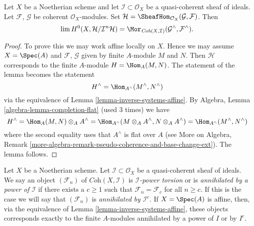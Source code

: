 \begin{lemma}
\label{lemma-completion-internal-hom}
Let $X$ be a Noetherian scheme and let $\mathcal{I} \subset \mathcal{O}_X$
be a quasi-coherent sheaf of ideals. Let $\mathcal{F}$, $\mathcal{G}$ be
coherent $\mathcal{O}_X$-modules. Set
$\mathcal{H} = \SheafHom_{\mathcal{O}_X}(\mathcal{G}, \mathcal{F})$.
Then
$$
\lim H^0(X, \mathcal{H}/\mathcal{I}^n\mathcal{H}) =
\Mor_{\textit{Coh}(X, \mathcal{I})}
(\mathcal{G}^\wedge, \mathcal{F}^\wedge).
$$
\end{lemma}

\begin{proof}
To prove this we may work affine locally on $X$.
Hence we may assume $X = \Spec(A)$ and $\mathcal{F}$, $\mathcal{G}$
given by finite $A$-module $M$ and $N$. Then $\mathcal{H}$
corresponds to the finite $A$-module $H = \Hom_A(M, N)$.
The statement of the lemma becomes the statement
$$
H^\wedge = \Hom_{A^\wedge}(M^\wedge, N^\wedge)
$$
via the equivalence of Lemma \ref{lemma-inverse-systems-affine}.
By Algebra, Lemma \ref{algebra-lemma-completion-flat}
(used 3 times) we have
$$
H^\wedge = \Hom_A(M, N) \otimes_A A^\wedge =
\Hom_{A^\wedge}(M \otimes_A A^\wedge, N \otimes_A A^\wedge) =
\Hom_{A^\wedge}(M^\wedge, N^\wedge)
$$
where the second equality uses that $A^\wedge$ is flat over $A$
(see More on Algebra, Remark
\ref{more-algebra-remark-pseudo-coherence-and-base-change-ext}).
The lemma follows.
\end{proof}

\noindent
Let $X$ be a Noetherian scheme. Let $\mathcal{I} \subset \mathcal{O}_X$
be a quasi-coherent sheaf of ideals. We say an object $(\mathcal{F}_n)$ of
$\textit{Coh}(X, \mathcal{I})$ is {\it $\mathcal{I}$-power torsion}
or is {\it annihilated by a power of $\mathcal{I}$} if there exists
a $c \geq 1$ such that $\mathcal{F}_n = \mathcal{F}_c$ for all $n \geq c$.
If this is the case we will say that $(\mathcal{F}_n)$ is {\it annihilated by
$\mathcal{I}^c$}. If $X = \Spec(A)$ is affine, then, via the equivalence of
Lemma \ref{lemma-inverse-systems-affine},
these objects corresponds exactly to the finite $A$-modules
annihilated by a power of $I$ or by $I^c$.

